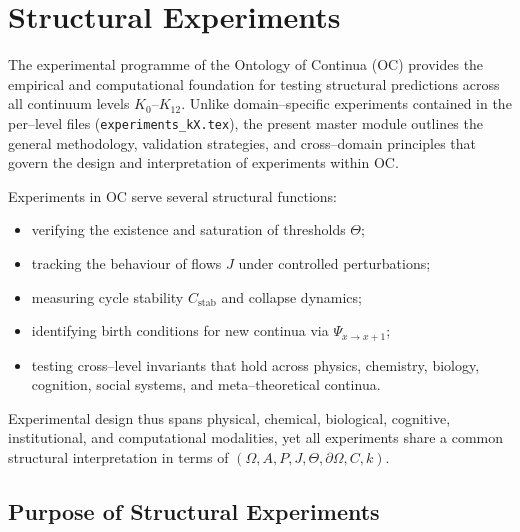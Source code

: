 
\section{Structural Experiments}
\label{sec:experiments-master}

The experimental programme of the Ontology of Continua (OC) provides the
empirical and computational foundation for testing structural predictions
across all continuum levels $K_0$–$K_{12}$.  
Unlike domain–specific experiments contained in the per–level files
(\texttt{experiments\_kX.tex}), the present master module outlines the
general methodology, validation strategies, and cross–domain principles
that govern the design and interpretation of experiments within OC.

Experiments in OC serve several structural functions:
\begin{itemize}
    \item verifying the existence and saturation of thresholds $\Theta$;
    \item tracking the behaviour of flows $J$ under controlled perturbations;
    \item measuring cycle stability $C_{\mathrm{stab}}$ and collapse dynamics;
    \item identifying birth conditions for new continua via $\Psi_{x\to x+1}$;
    \item testing cross–level invariants that hold across physics, chemistry,
          biology, cognition, social systems, and meta–theoretical continua.
\end{itemize}

Experimental design thus spans physical, chemical, biological, cognitive,
institutional, and computational modalities, yet all experiments share a
common structural interpretation in terms of $(\Omega, A, P, J, \Theta,
\partial\Omega, C, k)$.


\subsection{Purpose of Structural Experiments}

